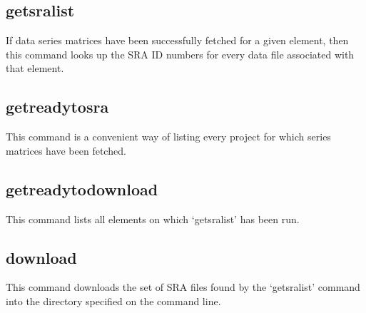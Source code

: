\documentclass[12pt,letterpaper]{article}
\begin{document}
\subsection{getsralist}
If data series matrices have been successfully fetched for a given element, then this command looks up the SRA ID numbers for every data file associated
with that element.

\subsection{getreadytosra}
This command is a convenient way of listing every project for which series matrices have been fetched.

\subsection{getreadytodownload}
This command lists all elements on which `getsralist' has been run.

\subsection{download}
This command downloads the set of SRA files found by the `getsralist' command into the directory specified on the command line.
\end{document}

